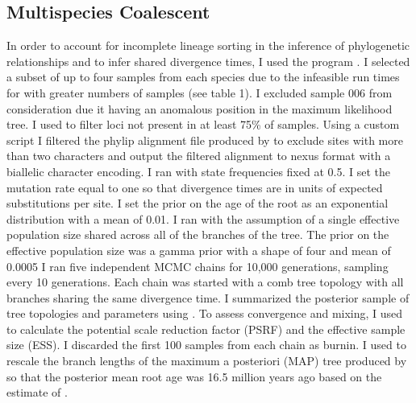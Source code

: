 \subsection{Multispecies Coalescent}
In order to account for incomplete lineage sorting in the inference of phylogenetic
relationships and to infer shared divergence times, I used the program \phycoeval.
I selected a subset of up to four samples from each species due to the 
infeasible run times for \phycoeval with greater numbers of samples (see table 1).
I excluded sample 006 from consideration due it having an anomalous   
position in the maximum likelihood tree.
I used \pyrad to filter loci not present in at least 75\% of samples. 
Using a custom script I filtered the phylip alignment file produced by \pyrad 
to exclude sites with more than two  characters and output the filtered alignment 
to nexus format with a biallelic character encoding. 
I ran \phycoeval with state frequencies fixed at 0.5.
I set the mutation rate equal to one so that divergence times are in units of 
expected substitutions per site. 
I set the prior on the age of the root as an exponential distribution with a mean
of 0.01.
I ran \phycoeval with the assumption of a single effective population size
shared across all of the branches of the tree.
The prior on the effective population size was a gamma prior with a shape of
four and mean of 0.0005
I ran five independent MCMC chains for 10,000 generations, sampling every 10 
generations.
Each chain was started with a comb tree topology with all branches sharing the
same divergence time. 
I summarized the posterior sample of tree topologies and parameters using 
\sumphycoeval.
To assess convergence and mixing, I used \sumphycoeval to calculate the
potential scale reduction factor (PSRF) and the effective sample size (ESS).
I discarded the first 100 samples from each chain as burnin.
I used \sumphycoeval to rescale the branch lengths of the maximum a posteriori 
(MAP) tree produced by \sumphycoeval so that the posterior mean root age was 
16.5 million years ago based on the estimate of \cite{feng2017}.

